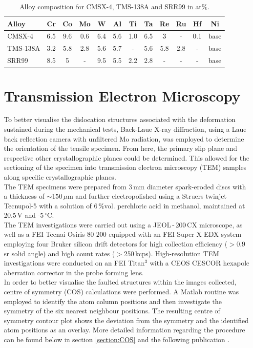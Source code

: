 \documentclass[a4paper,12pt,times,numbered,print,index]{Classes/PhDThesisPSnPDF}
\begin{document}
\begin{table}[b]
	\caption{Alloy composition for CMSX-4, TMS-138A and SRR99 in at\%. \label{tab:comp}}
	\centering
	\begin{tabular}{l | ccccccccccc}
	\rowcolor[HTML]{C0C0C0}
\hline
Alloy & Cr & Co & Mo & W & Al & Ti & Ta & Re & Ru & Hf & Ni\\
\hline \hline
CMSX-4 & 6.5 & 9.6 & 0.6 & 6.4 & 5.6 & 1.0 & 6.5 & 3 & - & 0.1 & base \\ \hline
TMS-138A & 3.2 & 5.8 & 2.8 & 5.6 & 5.7 & - & 5.6 & 5.8 & 2.8 & - & base\\ \hline
    SRR99 & 8.5 & 5 & - & 9.5 & 5.5 & 2.2 & 2.8 & - & - & - & base\\ \hline
	\end{tabular}
\end{table}

\section*{Transmission Electron Microscopy}
To better visualise the dislocation structures associated with the deformation sustained during the mechanical tests, Back-Laue X-ray diffraction, using a Laue back reflection camera with unfiltered Mo radiation, was employed to determine the orientation of the tensile specimen. From here, the primary slip plane and respective other crystallographic planes could be determined. This allowed for the sectioning of the specimen into transmission electron microscopy (TEM) samples along specific crystallographic planes.\\
The TEM specimens were prepared from 3\,mm diameter spark-eroded discs with a thickness of $\sim$150\,$\mu\textrm{m}$ and further electropolished using a Struers twinjet Tecnupol-5 with a solution of 6\,$\%\textrm{vol}$. perchloric acid in methanol, maintained at 20.5\,V and -5\,$^\circ$C.\\
The TEM investigations were carried out using a JEOL\,-\,200\,CX microscope, as well as a FEI Tecnai Osiris 80-200 equipped with an FEI Super-X EDX system employing four Bruker silicon drift detectors for high collection efficiency ($>$0.9\,sr solid angle) and high count rates ($>$250\,kcps). High-resolution TEM investigations were conducted on an FEI Titan$^3$ with a CEOS CESCOR hexapole aberration corrector in the probe forming lens.\\
In order to better visualise the faulted structures within the images collected, centre of symmetry (COS) calculations were performed. A Matlab routine was employed to identify the atom column positions and then investigate the symmetry of the six nearest neighbour positions. The resulting centre of symmetry contour plot shows the deviation from the symmetry and the identified atom positions as an overlay. More detailed information regarding the procedure can be found below in section \ref{section:COS} and the following publication \cite{messe2014precipitation}.
\end{document}
